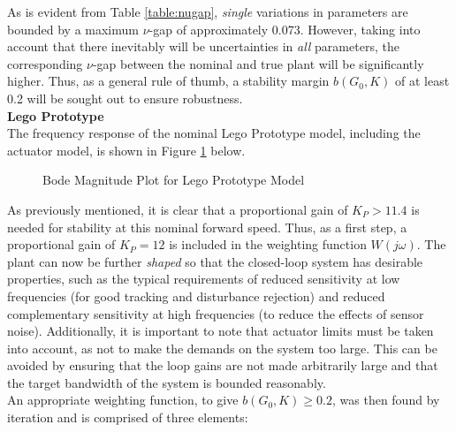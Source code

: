As is evident from Table \ref{table:nugap}, \textit{single} variations in parameters are bounded by a maximum $\nu$-gap of approximately 0.073. However, taking into account that there inevitably  will be uncertainties in \textit{all} parameters, the corresponding $\nu$-gap between the nominal and true plant will be significantly higher. Thus, as a general rule of thumb, a stability margin $b(G_0,K)$ of at least 0.2 will be sought out to ensure robustness. \\

\textbf{Lego Prototype} \\
The frequency response of the nominal Lego Prototype model, including the actuator model, is shown in Figure \ref{fig:bodeLego} below.

\begin{figure}[H]
	\centering
	\caption{Bode Magnitude Plot for Lego Prototype Model}
	\label{fig:bodeLego}
\end{figure}

As previously mentioned, it is clear that a proportional gain of $K_P>11.4$ is needed for stability at this nominal forward speed. Thus, as a first step, a proportional gain of $K_P=12$ is included in the weighting function $W(j\omega)$. The plant can now be further \textit{shaped} so that the closed-loop system has desirable properties, such as the typical requirements of reduced sensitivity at low frequencies (for good tracking and disturbance rejection) and reduced complementary sensitivity at high frequencies (to reduce the effects of sensor noise). Additionally, it is important to note that actuator limits must be taken into account, as not to make the demands on the system too large. This can be avoided by ensuring that the loop gains are not made arbitrarily large and that the target bandwidth of the system is bounded reasonably.  \\

An appropriate weighting function, to give $b(G_0,K) \geq 0.2$, was then found by iteration and is comprised of three elements:

